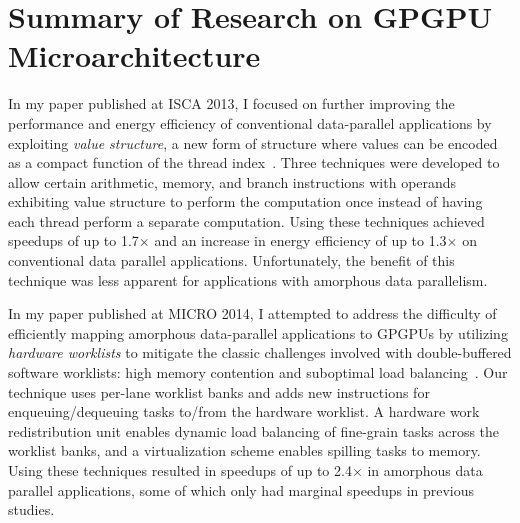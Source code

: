 
\section{Summary of Research on GPGPU Microarchitecture}
\label{sec-background}

In my paper published at ISCA 2013, I focused on further improving the
performance and energy efficiency of conventional data-parallel
applications by exploiting \emph{value structure}, a new form of
structure where values can be encoded as a compact function of the thread
index~\cite{kim-simt-vstruct-isca2013}. Three techniques were developed
to allow certain arithmetic, memory, and branch instructions with
operands exhibiting value structure to perform the computation once
instead of having each thread perform a separate computation. Using these
techniques achieved speedups of up to 1.7$\times$ and an increase in
energy efficiency of up to 1.3$\times$ on conventional data parallel
applications. Unfortunately, the benefit of this technique was less
apparent for applications with amorphous data parallelism.

In my paper published at MICRO 2014, I attempted to address the
difficulty of efficiently mapping amorphous data-parallel applications to
GPGPUs by utilizing \emph{hardware worklists} to mitigate the classic
challenges involved with double-buffered software worklists: high memory
contention and suboptimal load balancing~\cite{kim-hwwl-micro2014}. Our
technique uses per-lane worklist banks and adds new instructions for
enqueuing/dequeuing tasks to/from the hardware worklist. A hardware work
redistribution unit enables dynamic load balancing of fine-grain tasks
across the worklist banks, and a virtualization scheme enables spilling
tasks to memory. Using these techniques resulted in speedups of up to
2.4$\times$ in amorphous data parallel applications, some of which only
had marginal speedups in previous studies.
